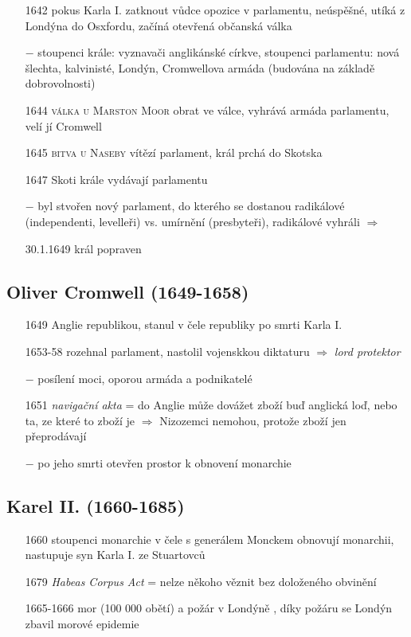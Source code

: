 \documentclass{article}
\begin{document}
\begin{itemize}
    \item[1642] pokus Karla I. zatknout vůdce opozice v parlamentu, neúspěšné, utíká z Londýna do Osxfordu, začíná otevřená občanská válka
    \item[$-$] stoupenci krále: vyznavači anglikánské církve, stoupenci parlamentu: nová šlechta, kalvinisté, Londýn, Cromwellova armáda (budována na základě dobrovolnosti)
    \item[1644] \textsc{válka u Marston Moor} obrat ve válce, vyhrává armáda parlamentu, velí jí Cromwell
    \item[1645] \textsc{bitva u Naseby} vítězí parlament, král prchá do Skotska
    \item[1647] Skoti krále vydávají parlamentu
    \item[$-$] byl stvořen nový parlament, do kterého se dostanou radikálové (independenti, levelleři) vs. umírnění (presbyteři), radikálové vyhráli $\Rightarrow$
    \item[30.1.1649] král popraven
\end{itemize}

\subsection*{Oliver Cromwell (1649-1658)}
\begin{itemize}
    \vspace{-0.5em}
    \setlength\itemsep{0.15em}
    \item[1649] Anglie republikou, stanul v čele republiky po smrti Karla I.
    \item[1653-58]  rozehnal parlament, nastolil vojenskkou diktaturu $\Rightarrow$ \textit{lord protektor}
    \item[$-$] posílení moci, oporou armáda a podnikatelé
    \item[1651] \textit{navigační akta} = do Anglie může dovážet zboží buď anglická loď, nebo ta, ze které to zboží je $\Rightarrow$ Nizozemci nemohou, protože zboží jen přeprodávají
    \item[$-$] po jeho smrti otevřen prostor k obnovení monarchie
\end{itemize}

\subsection*{Karel II. (1660-1685)}
\begin{itemize}
    \vspace{-0.5em}
    \setlength\itemsep{0.15em}
    \item[1660] stoupenci monarchie v čele s generálem Monckem obnovují monarchii, nastupuje syn Karla I. ze Stuartovců
    \item[1679] \textit{Habeas Corpus Act} = nelze někoho věznit bez doloženého obvinění
    \item[1665-1666] mor (100 000 obětí) a požár v Londýně , díky požáru se Londýn zbavil morové epidemie
\end{itemize}
\end{document}

